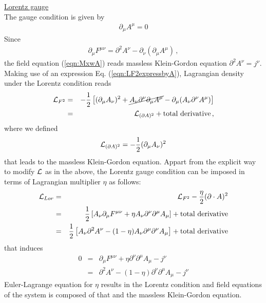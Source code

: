 \bigskip
\noindent
\underline{Lorentz gauge}\\
The gauge condition is given by
\begin{eqnarray}
\partial_\mu A^\mu = 0
\label{eqn:LorentzCond}
\end{eqnarray}
Since
\begin{eqnarray}
\partial_\mu F^{\mu \nu} = \partial^2 A^\nu - \partial_\nu (\partial_\mu A^\mu)
\,,
\end{eqnarray}
the field equation (\ref{eqn:MxwA}) reads massless Klein-Gordon equation
$\partial^2 A^\nu = j^\nu$.
Making use of an expression Eq. (\ref{eqn:LF2expressbyA}), Lagrangian density under 
the Lorentz condition reads
\begin{eqnarray}
{\cal L}_{F^2}
&=&
- \frac{1}{2}
\left[
(\partial_\mu A_\nu)^2 + 
\cancel
{
A_\nu \partial^\nu 
\partial_\mu A^\mu
}
- \partial_\mu (A_\nu \partial^\nu A^\mu)
\right]
\nonumber\\
&=&
{\cal L}_{(\partial A)^2} + \mbox{total derivative}
\,,
\label{eqn:LagF2Lorentz}
\end{eqnarray}
where we defined
\begin{eqnarray}
{\cal L}_{(\partial A)^2}
=
- \frac{1}{2}
(\partial_\mu A_\nu)^2
\label{eqn:LagdenDA2}
\end{eqnarray}
that leads to the massless Klein-Gordon equation.
Appart from the explicit way to modify ${\cal L}$ as in the above, 
the Lorentz gauge condition can be imposed in terms of Lagrangian
multiplier $\eta$ as follows:
\begin{eqnarray}
{\cal L}_{Lor}
&=&
{\cal L}_{F^2}
-
\frac{\eta}{2} (\partial \cdot A)^2
\nonumber\\
&=&
\frac{1}{2}
\left[
A_\nu \partial_\mu F^{\mu \nu}
+
\eta A_\nu \partial^\nu \partial^\mu A_\mu
\right]
+ \mbox{total derivative}
\nonumber\\
&=&
\frac{1}{2}
\left[
A_\nu \partial^2 A^\nu - (1 - \eta) A_\nu \partial^\mu \partial^\nu A_\mu
\right]
+ \mbox{total derivative}
\label{eqn:LorentzLagmultip}
\end{eqnarray}
that induces
\begin{eqnarray}
0
&=&
\partial_\mu F^{\mu \nu}
+ \eta \partial^\nu \partial^\mu A_\mu
- j^\nu
\nonumber\\
&=&
\partial^2 A^\nu
- (1 - \eta)
\partial^\nu \partial^\mu A_\mu
- j^\nu
\end{eqnarray}
Euler-Lagrange equation for $\eta$ results in the Lorentz condition and
field equations of the system is composed of that and the massless Klein-Gordon equation.

